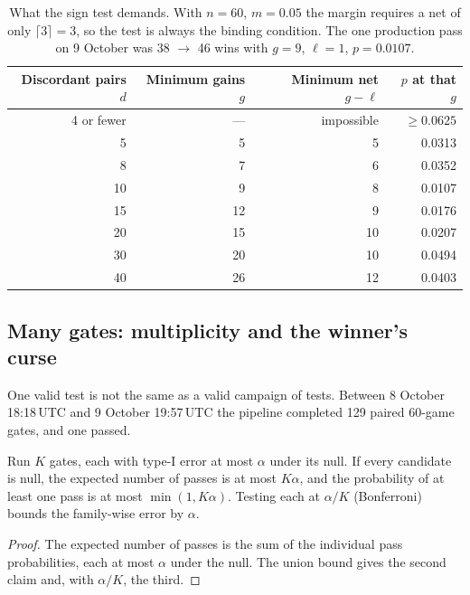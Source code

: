 \begin{table}[htbp]
\centering\small
\begin{tabular}{rrrr}
\toprule
Discordant pairs $d$ & Minimum gains $g$ & Minimum net $g-\ell$ & $p$ at that $g$ \\
\midrule
4 or fewer & --- & impossible & $\ge0.0625$ \\
5 & 5 & 5 & 0.0313 \\
8 & 7 & 6 & 0.0352 \\
10 & 9 & 8 & 0.0107 \\
15 & 12 & 9 & 0.0176 \\
20 & 15 & 10 & 0.0207 \\
30 & 20 & 10 & 0.0494 \\
40 & 26 & 12 & 0.0403 \\
\bottomrule
\end{tabular}
\caption{What the sign test demands. With $n=60$, $m=0.05$ the margin
requires a net of only $\lceil3\rceil=3$, so the test is always the binding
condition. The one production pass on 9 October was 38 $\to$ 46 wins with
$g=9$, $\ell=1$, $p=0.0107$.}
\label{tab:signtest}
\end{table}


\subsection{Many gates: multiplicity and the winner's curse}
\label{sec:multiplicity}
One valid test is not the same as a valid campaign of tests. Between 8
October 18:18\,UTC and 9 October 19:57\,UTC the pipeline completed 129 paired
60-game gates, and one passed.

\begin{proposition}
\label{prop:multiplicity}
Run $K$ gates, each with type-I error at most $\alpha$ under its null. If every
candidate is null, the expected number of passes is at most $K\alpha$, and the
probability of at least one pass is at most $\min(1,K\alpha)$. Testing each at
$\alpha/K$ (Bonferroni) bounds the family-wise error by $\alpha$.
\end{proposition}
\begin{proof}
The expected number of passes is the sum of the individual pass probabilities,
each at most $\alpha$ under the null. The union bound gives the second claim
and, with $\alpha/K$, the third.
\end{proof}

